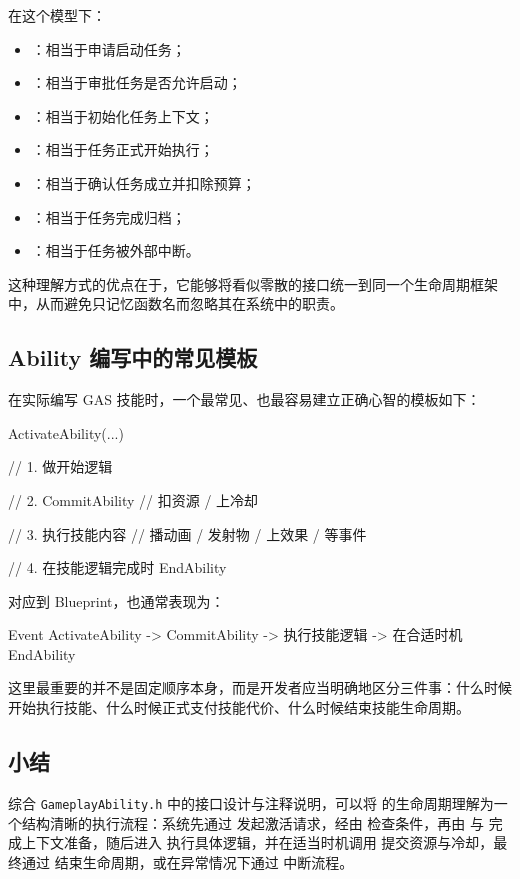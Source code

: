在这个模型下：

\begin{itemize}
	\item {}：相当于申请启动任务；
	\item {}：相当于审批任务是否允许启动；
	\item {}：相当于初始化任务上下文；
	\item {}：相当于任务正式开始执行；
	\item {}：相当于确认任务成立并扣除预算；
	\item {}：相当于任务完成归档；
	\item {}：相当于任务被外部中断。
\end{itemize}

这种理解方式的优点在于，它能够将看似零散的接口统一到同一个生命周期框架中，从而避免只记忆函数名而忽略其在系统中的职责。

\subsection{Ability 编写中的常见模板}

在实际编写 GAS 技能时，一个最常见、也最容易建立正确心智的模板如下：

\begin{code}
	ActivateAbility(...)
	{
		// 1. 做开始逻辑
		
		// 2. CommitAbility
		//    扣资源 / 上冷却
		
		// 3. 执行技能内容
		//    播动画 / 发射物 / 上效果 / 等事件
		
		// 4. 在技能逻辑完成时 EndAbility
	}
\end{code}

对应到 Blueprint，也通常表现为：

\begin{code}
	Event ActivateAbility
	-> CommitAbility
	-> 执行技能逻辑
	-> 在合适时机 EndAbility
\end{code}

这里最重要的并不是固定顺序本身，而是开发者应当明确地区分三件事：什么时候开始执行技能、什么时候正式支付技能代价、什么时候结束技能生命周期。

\subsection{小结}

综合 \texttt{GameplayAbility.h} 中的接口设计与注释说明，可以将  的生命周期理解为一个结构清晰的执行流程：系统先通过  发起激活请求，经由  检查条件，再由  与  完成上下文准备，随后进入  执行具体逻辑，并在适当时机调用  提交资源与冷却，最终通过  结束生命周期，或在异常情况下通过  中断流程。

